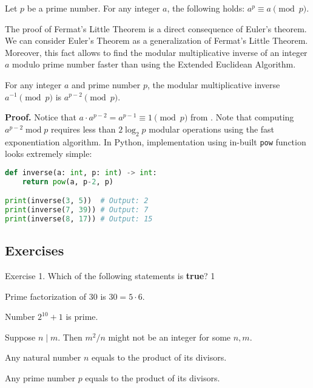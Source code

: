 \documentclass[../lecture-notes-148x210.tex]{subfiles}
\begin{document}
\begin{theorem}  \label{th:fermat_little_theorem}
    Let $p$ be a prime number. For any integer $a$, the following holds: $a^{p} \equiv a \pmod{p}$.
\end{theorem}

The proof of Fermat's Little Theorem is a direct consequence of Euler's theorem.
We can consider Euler's Theorem as a generalization of Fermat's Little Theorem. Moreover,
this fact allows to find the modular multiplicative inverse of an integer $a$ modulo prime 
number faster than using the Extended Euclidean Algorithm.

\begin{corollary}
    For any integer $a$ and prime number $p$, the modular multiplicative inverse $a^{-1} \pmod{p}$ is $a^{p-2} \pmod{p}$.
\end{corollary}

\textbf{Proof.} Notice that $a \cdot a^{p-2} = a^{p-1} \equiv 1 \pmod{p}$ from . 
Note that computing $a^{p-2} \; \text{mod} \; p$ requires less than $2\log_2p$ modular operations using 
the fast exponentiation algorithm. In Python, implementation using in-built \texttt{pow} function 
looks extremely simple:
\begin{lstlisting}[language=Python]
def inverse(a: int, p: int) -> int:
    return pow(a, p-2, p)

print(inverse(3, 5))  # Output: 2
print(inverse(7, 39)) # Output: 7
print(inverse(8, 17)) # Output: 15
\end{lstlisting}

\subsection{Exercises}

\begin{xexercise}
    {Exercise 1.}
    {Which of the following statements is \textbf{true}?}
    {1}
    {
        \item Prime factorization of $30$ is $30=5 \cdot 6$.
        \item Number $2^{10}+1$ is prime.
        \item Suppose $n \mid m$. Then $m^2/n$ might not be an integer for some $n,m$.
        \item Any natural number $n$ equals to the product of its divisors.
        \item Any prime number $p$ equals to the product of its divisors.
    }
\end{xexercise}
\end{document}
